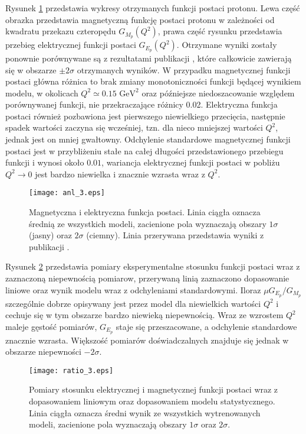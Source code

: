 \documentclass[11pt]{book}
\theoremstyle{definition}
\begin{document}
Rysunek \ref{fig:ff3} przedstawia wykresy otrzymanych funkcji postaci protonu. Lewa część obrazka przedstawia magnetyczną funkcję postaci protonu w zależności od kwadratu przekazu czteropędu $G_{M_p}\left(Q^2\right)$, prawa część rysunku przedstawia przebieg elektrycznej funkcji postaci $G_{E_p}\left(Q^2\right)$. Otrzymane wyniki zostały ponownie porównywane są z rezultatami publikacji \cite{2009PhRvC..79f5204A}, które całkowicie zawierają się w obszarze $\pm 2\sigma$ otrzymanych wyników. W przypadku magnetycznej funkcji postaci główna różnica to brak zmiany monotoniczności funkcji będącej wynikiem modelu, w okolicach $Q^2 \simeq 0.15 \text{ GeV}^2$ oraz późniejsze niedoszacowanie względem porównywanej funkcji, nie przekraczające różnicy 0.02. Elektryczna funkcja postaci również pozbawiona jest pierwszego niewielkiego przecięcia, następnie spadek wartości zaczyna się wcześniej, tzn. dla nieco mniejszej wartości $Q^2$, jednak jest on mniej gwałtowny. Odchylenie standardowe magnetycznej funkcji postaci jest w przybliżeniu stałe na całej długości przedstawionego przebiegu funkcji i wynosi około $0.01$, wariancja elektrycznej funkcji postaci w pobliżu $Q^2 \rightarrow 0$ jest bardzo niewielka i znacznie wzrasta wraz z $Q^2$.
% 
\begin{figure}[hp!]
	\centering
	\texttt{[image: anl\_3.eps]}
	\caption{Magnetyczna i elektryczna funkcja postaci. Linia ciągła oznacza średnią ze wszystkich modeli, zacienione pola wyznaczają obszary $1 \sigma$ (jasny) oraz $2\sigma$ (ciemny). Linia przerywana przedstawia wyniki z publikacji \cite{2009PhRvC..79f5204A}. } 
	\label{fig:ff3}
\end{figure}

Rysunek \ref{fig:ratio3} przedstawia pomiary eksperymentalne stosunku funkcji postaci wraz z zaznaczoną niepewnością pomiarow, przerywaną linią zaznaczono dopasowanie liniowe oraz wynik modelu wraz z odchyleniami standardowymi. Iloraz $\mu G_{E_p} / G_{M_p}$ szczególnie dobrze opisywany jest przez model dla niewielkich wartości $Q^2$ i cechuje się w tym obszarze bardzo niewieką niepewnością. Wraz ze wzrostem $Q^2$ maleje gęstość pomiarów, $G_{E_p}$ staje się przeszacowane, a odchylenie standardowe znacznie wzrasta. Większość pomiarów doświadczalnych znajduje się jednak w obszarze niepewności $-2\sigma$.

\begin{figure}[hp!]
	\centering
	\texttt{[image: ratio\_3.eps]}
	\caption{Pomiary stosunku elektrycznej i magnetycznej funkcji postaci wraz z dopasowaniem liniowym oraz dopasowaniem modelu statystycznego. Linia ciągła oznacza średni wynik ze wszystkich wytrenowanych modeli, zacienione pola wyznaczają obszary $1 \sigma$ oraz $2\sigma$.} 
	\label{fig:ratio3}
\end{figure}
\end{document}
